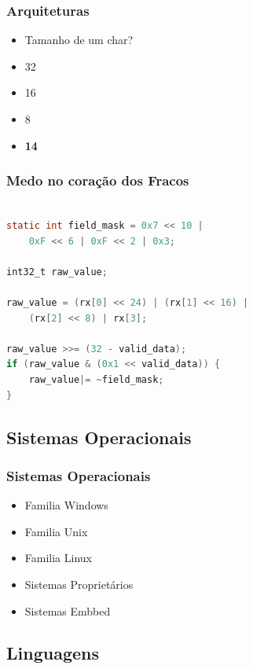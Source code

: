 \documentclass{beamer}
\begin{document}
\begin{frame} \frametitle{Arquiteturas}
    \begin{itemize}
    \item Tamanho de um char?
    \pause
    \linebreak
    \item 32
    \item 16
    \item 8
    \pause
    \linebreak
    \item \textbf{14}
    \end{itemize}
\end{frame}

\begin{frame}[fragile] \frametitle{Medo no coração dos Fracos}
    \begin{lstlisting}[language=C]

static int field_mask = 0x7 << 10 |
    0xF << 6 | 0xF << 2 | 0x3;

int32_t raw_value;

raw_value = (rx[0] << 24) | (rx[1] << 16) |
    (rx[2] << 8) | rx[3];

raw_value >>= (32 - valid_data);
if (raw_value & (0x1 << valid_data)) {
    raw_value|= ~field_mask;
}

    \end{lstlisting}
\end{frame}

\subsection{Sistemas Operacionais}

\begin{frame} \frametitle{Sistemas Operacionais}
 \begin{itemize}
  \item Familia Windows
  \item Familia Unix
  \item Familia Linux
  \item Sistemas Proprietários
  \item Sistemas Embbed
 \end{itemize}
\end{frame}

\subsection {Linguagens}
\end{document}
